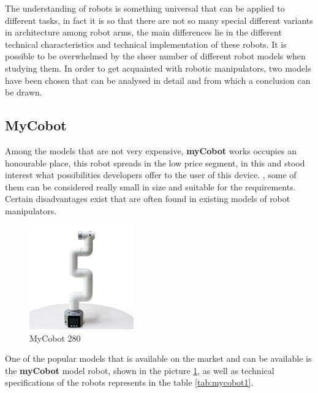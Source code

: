 
The understanding of robots is something universal that can be applied to different tasks, in fact it is so that there are not so many special 
different variants in architecture among robot arms, the main differences lie in the different technical characteristics and technical implementation 
of these robots. It is possible to be overwhelmed by the sheer number of different robot models when studying them. In order to get acquainted with robotic
 manipulators, two models have been chosen that can be analysed in detail and from which a conclusion can be drawn. 

\subsection*{MyCobot}
Among the models that are not very expensive, \textbf{myCobot} works occupies an honourable place, this robot spreads in the low price segment, in this and stood interest 
what possibilities developers offer to the user of this device. , some of them can be considered really small in size and suitable for the requirements.
Certain disadvantages exist that are often found in existing models of robot manipulators.


    
    


\begin{figure}[H]
	\centering
	\includegraphics[width=0.4\textwidth]{Src/images/myCobot.png}
	\caption{MyCobot 280}
    \label{fig:mycobot1}
    
\end{figure}
One of the popular models that is available on the market and can be available is the \textbf{myCobot} model robot, shown in the picture \ref*{fig:mycobot1}, as well as technical specifications of the robots represents in the table \ref*{tab:mycobot1}.


